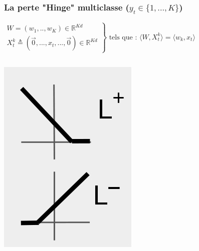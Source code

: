 \documentclass{beamer}
\begin{document}
\begin{frame}
	\frametitle{La perte "Hinge" multiclasse ($y_t \in \{1,...,K\}$)}
		\begin{exampleblock}{}
			$
			\left.
			\begin{array}{l}
			W = (w_1,..,w_K) \in \mathbb{R}^{K d}\\
			X_t^k \triangleq (\vec{0}, ...,  x_t, ..., \vec{0}) \in \mathbb{R}^{K d}
			\end{array}
			\right\}
			\text{ tels que : }
			\langle W, X^k_t\rangle = \langle w_k, x_t\rangle
			$
			
		\end{exampleblock}
		
	\begin{columns}
		\begin{column}{.2 \linewidth}
			\centerline{\includegraphics[width=\linewidth]{figs/cap-loss.png}}

\end{column}
\end{columns}
\end{frame}
\end{document}
